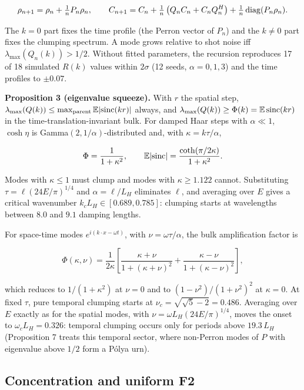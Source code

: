 \[\rho_{n+1}=\rho_n+\tfrac1nP_n\rho_n,\qquad C_{n+1}=C_n+\tfrac1n\left(Q_nC_n+C_nQ_n^{H}\right)+\tfrac1n\,{\rm diag}(P_n\rho_n).\]

The \(k=0\) part fixes the time profile (the Perron vector
of \(P_n\)) and the \(k\ne0\) part fixes the clumping
spectrum. A mode grows relative to shot noise iff
\(\lambda_{\max}(Q_n(k))>1/2\). Without fitted parameters,
the recursion reproduces 17 of 18 simulated \(R(k)\) values
within \(2\sigma\) (12 seeds, \(\alpha=0,1,3\)) and the time
profiles to \(\pm0.07\).

\textbf{Proposition 3 (eigenvalue squeeze).} With \(r\) the
spatial step,
\(\lambda_{\max}(Q(k))\le\max_{\rm parent}\mathbb{E}|{\rm sinc}(kr)|\)
always, and
\(\lambda_{\max}(Q(k))\ge\Phi(k)=\mathbb{E}\,{\rm sinc}(kr)\)
in the time-translation-invariant bulk. For damped Haar
steps with \(\alpha\ll1\), \(\cosh\eta\) is
Gamma\((2,1/\alpha)\)-distributed and, with
\(\kappa=k\tau/\alpha\),

\[\Phi=\frac{1}{1+\kappa^2},\qquad \mathbb{E}|{\rm sinc}|=\frac{\coth(\pi/2\kappa)}{1+\kappa^2}.\]

Modes with \(\kappa\le1\) must clump and modes with
\(\kappa\ge1.122\) cannot. Substituting
\(\tau=\ell(24E/\pi)^{1/4}\) and \(\alpha=\ell/L_H\)
eliminates \(\ell\), and averaging over \(E\) gives a
critical wavenumber \(k_cL_H\in[0.689,0.785]\): clumping
starts at wavelengths between \(8.0\) and \(9.1\) damping
lengths.

For space-time modes \(e^{i(k\cdot x-\omega t)}\), with
\(\nu=\omega\tau/\alpha\), the bulk amplification factor is

\[\Phi(\kappa,\nu)=\frac{1}{2\kappa}\left[\frac{\kappa+\nu}{1+(\kappa+\nu)^2}+\frac{\kappa-\nu}{1+(\kappa-\nu)^2}\right],\]

which reduces to \(1/(1+\kappa^2)\) at \(\nu=0\) and to
\((1-\nu^2)/(1+\nu^2)^2\) at \(\kappa=0\). At fixed
\(\tau\), pure temporal clumping starts at
\(\nu_c=\sqrt{\sqrt5-2}=0.486\). Averaging over \(E\)
exactly as for the spatial modes, with
\(\nu=\omega L_H(24E/\pi)^{1/4}\), moves the onset to
\(\omega_cL_H=0.326\): temporal clumping occurs only for
periods above \(19.3\,L_H\) (Proposition 7 treats this
temporal sector, where non-Perron modes of \(P\) with
eigenvalue above \(1/2\) form a Pólya urn).

\hypertarget{concentration-and-uniform-f2}{%
\subsection{Concentration and uniform
F2}\label{concentration-and-uniform-f2}}

